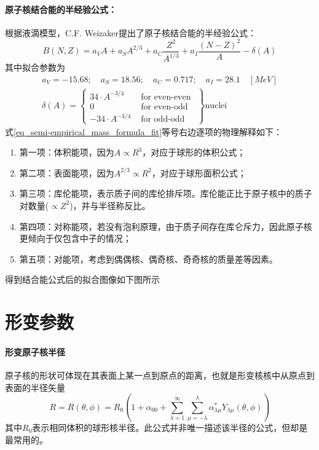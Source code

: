 \paragraph*{原子核结合能的半经验公式：}根据液滴模型，C.F. Weizaker提出了原子核结合能的半经验公式：
\begin{equation}
	B(N, Z) = a_V A + a_S A^{2/3} + a_C \frac{Z^2}{A^{1/3}} + a_I \frac{(N-Z)^2}{A} - \delta(A)	\label{eq_semi-empirical_mass_formula}
\end{equation} 
其中拟合参数为
\begin{equation}
    \begin{aligned}
		a_V = -15.68; \quad a_S = 18.56; \quad a_C = 0.717; \quad a_I = 28.1	\quad	[MeV]	\\
		\delta(A) = \left\{ \begin{array}{cc}
				34 \cdot A^{-3/4} & \text{ for even-even } \\
				0 & \text{ for even-odd }	\\
				-34 \cdot A^{-3/4} & \text{ for odd-odd }
		\end{array}\right\} \text{nuclei}
    \end{aligned}
    	\label{eq_semi-empirical_mass_formula_fit}
\end{equation} 
式\eqref{eq_semi-empirical_mass_formula_fit}等号右边逐项的物理解释如下：
\begin{enumerate}
	\item 第一项：体积能项，因为$ A \propto R^3$，对应于球形的体积公式；
	\item 第二项：表面能项，因为$ A^{2/3} \propto R^2$，对应于球形面积公式；
	\item 第三项：库伦能项，表示质子间的库伦排斥项。库伦能正比于原子核中的质子对数量($\propto Z^2$)，并与半径称反比。
	\item 第四项：对称能项，若没有泡利原理，由于质子间存在库仑斥力，因此原子核更倾向于仅包含中子的情况；
	\item 第五项：对能项，考虑到偶偶核、偶奇核、奇奇核的质量差等因素。
\end{enumerate}
得到结合能公式后的拟合图像如下图所示


\section{形变参数}
\paragraph*{形变原子核半径}
原子核的形状可体现在其表面上某一点到原点的距离，也就是形变核核中从原点到表面的半径矢量
\begin{equation}
	R = R(\theta, \phi) = R_0 ( 1 + \alpha_{00} + \sum_{\lambda = 1}^{\infty} \sum_{\mu = -\lambda}^{\lambda}\alpha^{*}_{\lambda\mu} Y_{\lambda\mu}(\theta, \phi) )	\label{eq_deform_radius}
\end{equation} 
其中$R_0$表示相同体积的球形核半径。此公式并非唯一描述该半径的公式，但却是最常用的。






